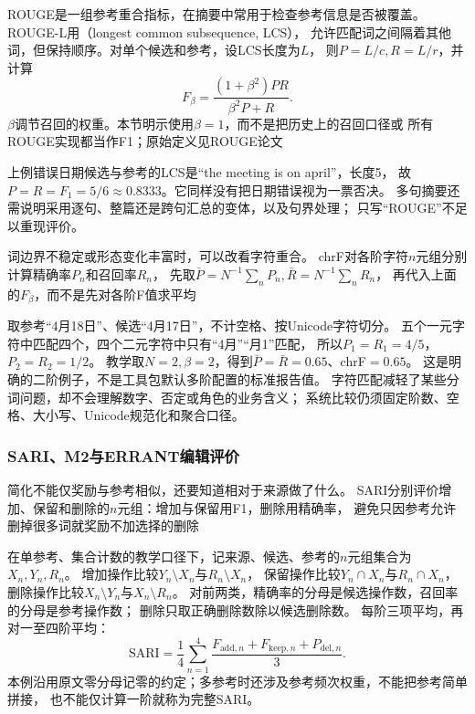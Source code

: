 ROUGE是一组参考重合指标，在摘要中常用于检查参考信息是否被覆盖。
ROUGE-L用（longest common subsequence, LCS），
允许匹配词之间隔着其他词，但保持顺序。对单个候选和参考，设LCS长度为$L$，
则$P=L/c,R=L/r$，并计算
\[
  F_\beta=\frac{(1+\beta^2)PR}{\beta^2P+R}.
\]
$\beta$调节召回的权重。本节明示使用$\beta=1$，而不是把历史上的召回口径或
所有ROUGE实现都当作F1；原始定义见ROUGE论文

上例错误日期候选与参考的LCS是“the meeting is on april”，长度5，
故$P=R=F_1=5/6\approx0.8333$。它同样没有把日期错误视为一票否决。
多句摘要还需说明采用逐句、整篇还是跨句汇总的变体，以及句界处理；
只写“ROUGE”不足以重现评价。

词边界不稳定或形态变化丰富时，可以改看字符重合。
chrF对各阶字符$n$元组分别计算精确率$P_n$和召回率$R_n$，
先取$\bar P=N^{-1}\sum_nP_n,\bar R=N^{-1}\sum_nR_n$，
再代入上面的$F_\beta$，而不是先对各阶F值求平均

取参考“4月18日”、候选“4月17日”，不计空格、按Unicode字符切分。
五个一元字符中匹配四个，四个二元字符中只有“4月”“月1”匹配，
所以$P_1=R_1=4/5$，$P_2=R_2=1/2$。
教学取$N=2,\beta=2$，得到$\bar P=\bar R=0.65$、chrF$=0.65$。
这是明确的二阶例子，不是工具包默认多阶配置的标准报告值。
字符匹配减轻了某些分词问题，却不会理解数字、否定或角色的业务含义；
系统比较仍须固定阶数、空格、大小写、Unicode规范化和聚合口径。

\subsubsection{SARI、M2与ERRANT编辑评价}
\label{sec:nlp-generation-edit-metrics}

简化不能仅奖励与参考相似，还要知道相对于来源做了什么。
SARI分别评价增加、保留和删除的$n$元组：增加与保留用F1，删除用精确率，
避免只因参考允许删掉很多词就奖励不加选择的删除

在单参考、集合计数的教学口径下，记来源、候选、参考的$n$元组集合为$X_n,Y_n,R_n$。
增加操作比较$Y_n\setminus X_n$与$R_n\setminus X_n$，
保留操作比较$Y_n\cap X_n$与$R_n\cap X_n$，
删除操作比较$X_n\setminus Y_n$与$X_n\setminus R_n$。
对前两类，精确率的分母是候选操作数，召回率的分母是参考操作数；
删除只取正确删除数除以候选删除数。
每阶三项平均，再对一至四阶平均：
\begin{equation}
  \mathrm{SARI}=\frac{1}{4}\sum_{n=1}^{4}
  \frac{F_{\mathrm{add},n}+F_{\mathrm{keep},n}+P_{\mathrm{del},n}}{3}.
  \label{eq:nlp-generation-sari}
\end{equation}
本例沿用原文零分母记零的约定；多参考时还涉及参考频次权重，不能把参考简单拼接，
也不能仅计算一阶就称为完整SARI。

